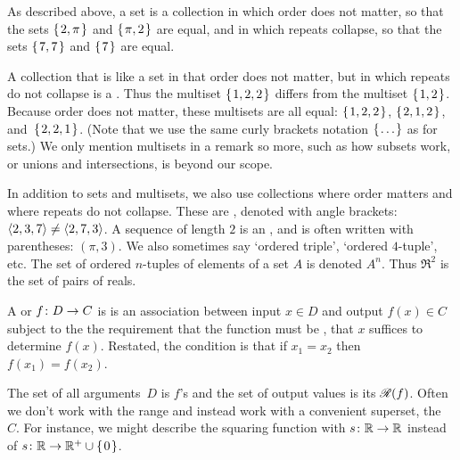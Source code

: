 As described above, a set is a collection in which 
order does not matter, so that the sets $\mbox{$\{\hspace{0.1em}2,\pi\hspace{0.1em}\}$}$
and $\mbox{$\{\hspace{0.1em}\pi,2\hspace{0.1em}\}$}$ are equal,
and in which repeats collapse, so that the sets
$\mbox{$\{\hspace{0.1em}7,7\hspace{0.1em}\}$}$ and $\mbox{$\{\hspace{0.1em}7\hspace{0.1em}\}$}$ are equal.

A collection that is like a set in that order does not matter,
but in which repeats do not collapse is a .
Thus the multiset $\mbox{$\{\hspace{0.1em}1,2,2\hspace{0.1em}\}$}$ differs from the multiset
$\mbox{$\{\hspace{0.1em}1,2\hspace{0.1em}\}$}$.
Because order does not matter, these multisets are all 
equal: $\mbox{$\{\hspace{0.1em}1,2,2\hspace{0.1em}\}$}$, $\mbox{$\{\hspace{0.1em}2,1,2\hspace{0.1em}\}$}$, and~$\mbox{$\{\hspace{0.1em}2,2,1\hspace{0.1em}\}$}$.
(Note that we use the same 
curly brackets notation  $\mbox{$\{\hspace{0.1em}\ldots\hspace{0.1em}\}$}$ as for sets.)
We only mention multisets in a remark so more, such as 
how subsets work, or unions and intersections, is beyond our scope.



In addition to sets and multisets,
we also use collections where order matters and where repeats do
not collapse.
These are , denoted with angle brackets:
\( \langle 2,3,7\rangle\neq\langle2,7,3\rangle \).
A sequence of length \( 2 \) is an 
,
and is often written with parentheses: \( (\pi,3) \).
We also sometimes say `ordered triple', `ordered \( 4 \)-tuple', etc.
The set of ordered \( n \)-tuples of elements of a set \( A \) is denoted
\( A^n \).
Thus \( \Re^2 \) is the set of pairs of reals.




A 
or   $\mbox{$f\colon D\to C$}$ is 
is an association between input
$x\in D$
and output
$f(x)\in C$ subject to the the requirement 
that the
function must be ,%
that \( x \) suffices to determine \( f(x) \).
Restated, the condition is that
if \( x_1=x_2 \) then \( f(x_1)=f(x_2) \).

The set of all arguments~$D$ is \( f \)'s 
and the set of output values is its 
 $\mathscr{R}(f)$.
Often we don't work with the range and instead
work with a convenient superset, the
~$C$.
For instance, we might describe the squaring function with $\mbox{$s\colon \mathbb{R}\to \mathbb{R}$}$
instead of $\mbox{$s\colon \mathbb{R}\to \mathbb{R}^+\cup \mbox{$\{\hspace{0.1em}0\hspace{0.1em}\}$}$}$.

